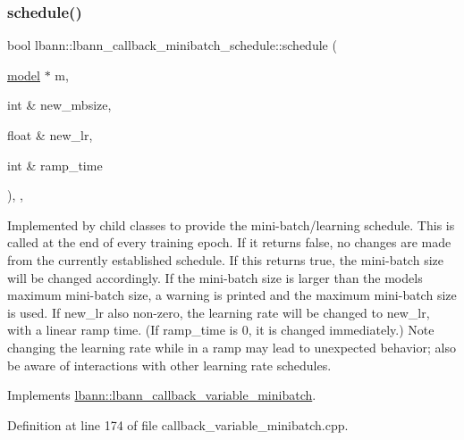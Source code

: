 \mbox{\label{classlbann_1_1lbann__callback__minibatch__schedule_af95cbe83a587590219174cb17828ea4b}} 
\subsubsection{\texorpdfstring{schedule()}{schedule()}}
{\footnotesize\ttfamily bool lbann\+::lbann\+\_\+callback\+\_\+minibatch\+\_\+schedule\+::schedule (\begin{DoxyParamCaption}\item[{\hyperlink{classlbann_1_1model}{model} $\ast$}]{m,  }\item[{int \&}]{new\+\_\+mbsize,  }\item[{float \&}]{new\+\_\+lr,  }\item[{int \&}]{ramp\+\_\+time }\end{DoxyParamCaption})\hspace{0.3cm}{\ttfamily [override]}, {\ttfamily [protected]}, {\ttfamily [virtual]}}

Implemented by child classes to provide the mini-\/batch/learning schedule. This is called at the end of every training epoch. If it returns false, no changes are made from the currently established schedule. If this returns true, the mini-\/batch size will be changed accordingly. If the mini-\/batch size is larger than the model\textquotesingle{}s maximum mini-\/batch size, a warning is printed and the maximum mini-\/batch size is used. If new\+\_\+lr also non-\/zero, the learning rate will be changed to new\+\_\+lr, with a linear ramp time. (If ramp\+\_\+time is 0, it is changed immediately.) Note changing the learning rate while in a ramp may lead to unexpected behavior; also be aware of interactions with other learning rate schedules. 

Implements \hyperlink{classlbann_1_1lbann__callback__variable__minibatch_ace13e8941491ddd28ef35c277cecb1ad}{lbann\+::lbann\+\_\+callback\+\_\+variable\+\_\+minibatch}.



Definition at line 174 of file callback\+\_\+variable\+\_\+minibatch.\+cpp.


